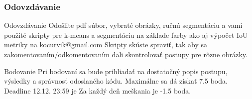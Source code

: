 \documentclass{beamer}
\begin{document}
\begin{frame}
\frametitle{Odovzdávanie}
\begin{block}{Odovzdávanie}
Odošlite pdf súbor, vybraté obrázky, ručnú segmentáciu a vami použité skripty pre k-means a segmentáciu na základe farby ako aj výpočet IoU metriky na kocurvik@gmail.com Skripty skúste spraviť, tak aby sa zakomentovaním/odkomentovaním dali skontrolovať postupy pre rôzne obrázky.
\end{block}

\begin{block}{Bodovanie}
Pri bodovaní sa bude prihliadať na dostatočný popis postupu, výsledky a správnosť odoslaného kódu. Maximálne sa dá získať 7.5 boda. Deadline 12.12. 23:59 je  Za každý deň meškania je -1.5 boda.
\end{block}
\end{frame}
\end{document}
